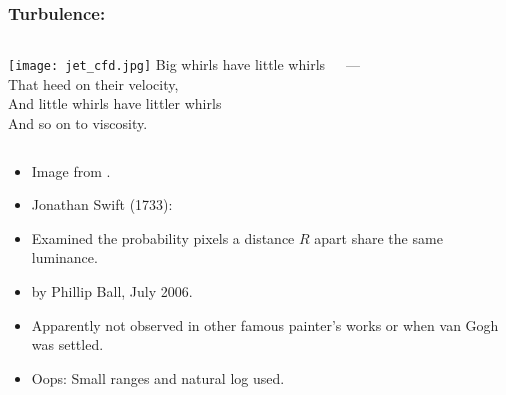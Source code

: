 \begin{frame}
  \frametitle{Turbulence:}


  \begin{block}{}
    \begin{columns}
      \texttt{[image: jet\_cfd.jpg]}    
      Big whirls have little whirls\\
      That heed on their velocity, \\
      And little whirls have littler whirls \\
      And so on to viscosity.
      
      \hfill---
    \end{columns}
  \end{block}

  \small

  \begin{itemize}
  \item 
    Image from .
  \item 
    Jonathan Swift (1733): 
  \end{itemize}

\end{frame}


\begin{frame}


  \begin{block}{}
    \begin{itemize}
    \item 
      Examined the probability pixels a distance $R$ apart share the same luminance.
    \item 
      by Phillip Ball, July 2006.
    \item 
      Apparently not observed in other famous painter's works
      or when van Gogh was settled.
    \item 
      Oops: Small ranges and natural log used.
    \end{itemize}
  \end{block}


\end{frame}


